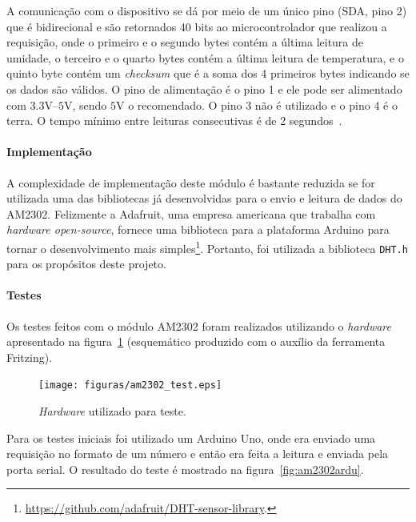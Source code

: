 		A comunicação com o dispositivo se dá por meio de um único pino (SDA, pino 2) que é
		bidirecional e são retornados 40 bits ao microcontrolador que realizou a requisição, onde
		o primeiro e o segundo bytes contém a última leitura de umidade,
		o terceiro e o quarto bytes contém a última leitura de temperatura,
		e o quinto byte contém um \textit{checksum} que é a soma dos 4 primeiros bytes
		indicando se os dados são válidos.
		O pino de alimentação é o pino 1 e ele pode ser alimentado com $3.3\textrm{V}$--$5\textrm{V}$,
		sendo $5\textrm{V}$ o recomendado. O pino 3 não é utilizado e o pino 4 é o terra.
		O tempo mínimo entre leituras consecutivas é de 2 segundos~\cite{aosong}.

	\paragraph{Implementação}

		A complexidade de implementação deste módulo é bastante reduzida
		se for utilizada uma das bibliotecas já desenvolvidas para o envio
		e leitura de dados do AM2302. Felizmente a Adafruit, uma empresa americana
		que trabalha com \textit{hardware open-source}, fornece uma biblioteca para
		a plataforma Arduino para tornar o desenvolvimento mais simples\footnote{\url{https://github.com/adafruit/DHT-sensor-library}.}.
		Portanto, foi utilizada a biblioteca \texttt{DHT.h} para os propósitos
		deste projeto.

	\paragraph{Testes}

		Os testes feitos com o módulo AM2302 foram realizados utilizando
		o \textit{hardware} apresentado na figura~\ref{fig:am2302test} (esquemático
		produzido com o auxílio da ferramenta Fritzing).

		\begin{figure}[!htbp]
		\begin{center}
		\texttt{[image: figuras/am2302\_test.eps]}
		\caption{\label{fig:am2302test}\textit{Hardware} utilizado para teste.}
		\end{center}
		\end{figure}

		Para os testes iniciais foi utilizado um Arduino Uno, onde era enviado uma requisição
		no formato de um número e então era feita a leitura e enviada pela porta serial.
		O resultado do teste é mostrado na figura~\ref{fig:am2302ardu}.

